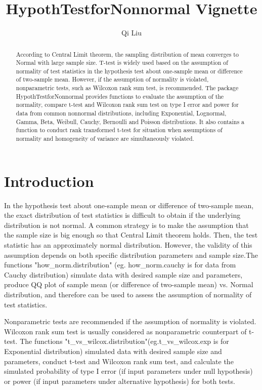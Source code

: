 \documentclass[11pt]{article}
\title{HypothTestforNonnormal Vignette}
\author{Qi Liu}
\begin{document}
\maketitle

\begin{abstract}
According to Central Limit theorem, the sampling distribution of mean converges to Normal with large sample size. T-test is widely used based on the assumption of normality of test statistics in the hypothesis test about one-sample mean or difference of two-sample mean. However, if the assumption of normality is violated, nonparametric tests, such as Wilcoxon rank sum test, is recommended. The package HypothTestforNonnormal provides functions to evaluate the assumption of the normality, compare t-test and Wilcoxon rank sum test on type I error and power for data from common nonnormal distributions, including Exponential, Lognormal, Gamma, Beta, Weibull, Cauchy, Bernoulli and Poisson distributions. It also contains a function to conduct rank transformed t-test for situation when assumptions of normality and homogeneity of variance are simultaneously violated.
\end{abstract}
\section{Introduction}

In the hypothesis test about one-sample mean or difference of two-sample mean, the exact distribution of test statistics is difficult to obtain if the underlying distribution is not normal. A common strategy is to make the assumption that the sample size is big enough so that Central Limit theorem holds. Then, the test statistic has an approximately normal distribution. However, the validity of this assumption depends on both specific distribution parameters and sample size.The functions "how\_norm.distribution" (eg. how\_norm.cauchy is for data from Cauchy distribution) simulate data with desired sample size and parameters, produce QQ plot of sample mean (or difference of two-sample mean) vs. Normal distribution, and therefore can be used to assess the assumption of normality of test statistics.

Nonparametric tests are recommended if the assumption of normality is violated. Wilcoxon rank sum test is usually considered as nonparametric counterpart of t-test. The functions "t\_vs\_wilcox.distribution"(eg.t\_vs\_wilcox.exp is for Exponential distribution) simulated data with desired sample size and parameters, conduct t-test and Wilcoxon rank sum test, and calculate the simulated probability of type I error (if input parameters under null hypothesis) or power (if input parameters under alternative hypothesis) for both tests.
\end{document}
